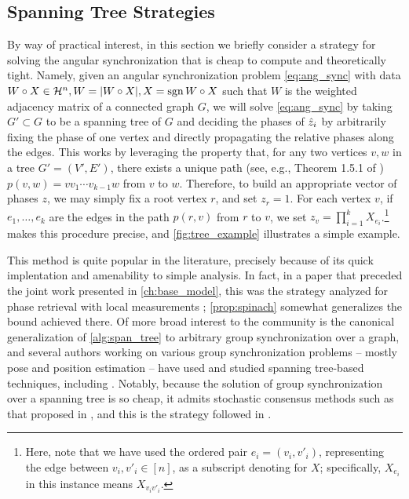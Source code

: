 \subsection{Spanning Tree Strategies}
\label{sec:ang_sync_tree}

By way of practical interest, in this section we briefly consider a strategy for solving the angular synchronization that is cheap to compute and theoretically tight.  Namely, given an angular synchronization problem \eqref{eq:ang_sync} with data $W \circ X \in \mathcal{H}^n, W = \lvert W \circ X\rvert, X = \operatorname{sgn}{W \circ X}$ such that $W$ is the weighted adjacency matrix of a connected graph $G$, we will solve \eqref{eq:ang_sync} by taking $G' \subset G$ to be a spanning tree of $G$ and deciding the phases of $\hat{z}_i$ by arbitrarily fixing the phase of one vertex and directly propagating the relative phases along the edges.  This works by leveraging the property that, for any two vertices $v, w$ in a tree $G' = (V', E')$, there exists a unique path (see, e.g., Theorem 1.5.1 of \cite{diestel2017graphtheory}) $p(v, w) = v v_1 \cdots v_{k-1} w$ from $v$ to $w$.  Therefore, to build an appropriate vector of phases $z$, we may simply fix a root vertex $r$, and set $z_r = 1$.  For each vertex $v$, if $e_1, \ldots, e_k$ are the edges in the path $p(r, v)$ from $r$ to $v$, we set $z_v = \prod_{i = 1}^k X_{e_i}$.\footnote{Here, note that we have used the ordered pair $e_i = (v_i, v'_i)$, representing the edge between $v_i, v'_i \in [n]$, as a subscript denoting for $X$; specifically, $X_{e_i}$ in this instance means $X_{v_i v'_i}$.}   makes this procedure precise, and \cref{fig:tree_example} illustrates a simple example.

This method is quite popular in the literature, precisely because of its quick implentation and amenability to simple analysis.  In fact, in a paper that preceded the joint work presented in \cref{ch:base_model}, this was the strategy analyzed for phase retrieval with local measurements \cite{IVW2015_FastPhase}; \cref{prop:spinach} somewhat generalizes the bound achieved there.  Of more broad interest to the community is the canonical generalization of \cref{alg:span_tree} to arbitrary group synchronization over a graph, and several authors working on various group synchronization problems -- mostly pose and position estimation -- have used and studied spanning tree-based techniques, including \cite{calafiore2016complex_pgo, calafiore2016planar_pgo, enqvist2011nonsequential,govindu2006motion_avg}.  Notably, because the solution of group synchronization over a spanning tree is so cheap, it admits stochastic consensus methods such as that proposed in \cite{fischler1981ransac}, and this is the strategy followed in \cite{govindu2006motion_avg}.

